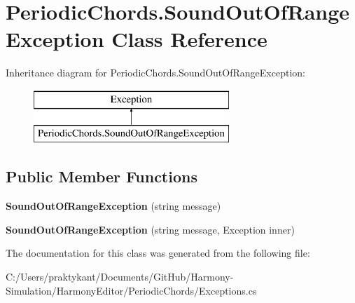 \hypertarget{class_periodic_chords_1_1_sound_out_of_range_exception}{\section{Periodic\+Chords.\+Sound\+Out\+Of\+Range\+Exception Class Reference}
\label{class_periodic_chords_1_1_sound_out_of_range_exception}
}
Inheritance diagram for Periodic\+Chords.\+Sound\+Out\+Of\+Range\+Exception\+:\begin{figure}[H]
\begin{center}
\leavevmode
\includegraphics[height=2.000000cm]{class_periodic_chords_1_1_sound_out_of_range_exception}
\end{center}
\end{figure}
\subsection*{Public Member Functions}
\begin{DoxyCompactItemize}
\item 
\hypertarget{class_periodic_chords_1_1_sound_out_of_range_exception_abd13be5d6f01f29a1a01a0622efd915b}{{\bfseries Sound\+Out\+Of\+Range\+Exception} (string message)}\label{class_periodic_chords_1_1_sound_out_of_range_exception_abd13be5d6f01f29a1a01a0622efd915b}

\item 
\hypertarget{class_periodic_chords_1_1_sound_out_of_range_exception_ac86e331d7e21c689f5bf087b61e67aaf}{{\bfseries Sound\+Out\+Of\+Range\+Exception} (string message, Exception inner)}\label{class_periodic_chords_1_1_sound_out_of_range_exception_ac86e331d7e21c689f5bf087b61e67aaf}

\end{DoxyCompactItemize}


The documentation for this class was generated from the following file\+:\begin{DoxyCompactItemize}
\item 
C\+:/\+Users/praktykant/\+Documents/\+Git\+Hub/\+Harmony-\/\+Simulation/\+Harmony\+Editor/\+Periodic\+Chords/Exceptions.\+cs\end{DoxyCompactItemize}
